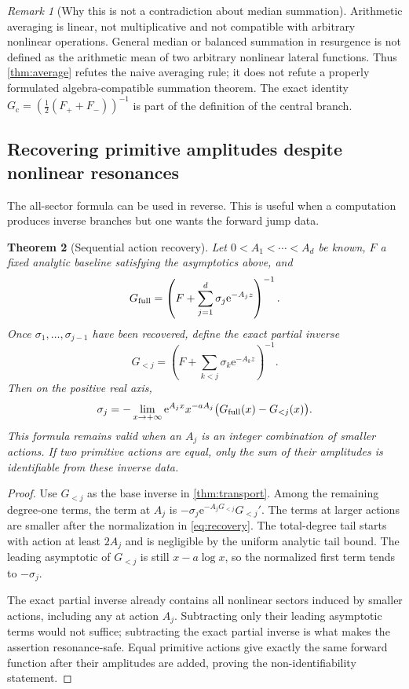 \documentclass[11pt,a4paper]{article}
\numberwithin{equation}{section}
\newtheorem{theorem}{Theorem}[section]
\theoremstyle{definition}
\theoremstyle{remark}
\newtheorem{remark}[theorem]{Remark}
\newcommand{\e}{\mathrm e}
\newcommand{\cG}{G_{\mathrm c}}
\begin{document}
\begin{remark}[Why this is not a contradiction about median summation]
Arithmetic averaging is linear, not multiplicative and not compatible with arbitrary nonlinear operations. General median or balanced summation in resurgence is not defined as the arithmetic mean of two arbitrary nonlinear lateral functions. Thus \cref{thm:average} refutes the naive averaging rule; it does not refute a properly formulated algebra-compatible summation theorem. The exact identity
$\cG=(\tfrac12(F_++F_-))^{-1}$ is part of the definition of the central branch.
\end{remark}

\subsection{Recovering primitive amplitudes despite nonlinear resonances}
The all-sector formula can be used in reverse. This is useful when a computation produces inverse branches but one wants the forward jump data.

\begin{theorem}[Sequential action recovery]
\label{thm:recovery}
Let $0<A_1<\cdots<A_d$ be known, $F$ a fixed analytic baseline satisfying the asymptotics above, and
\[
 G_{\rm full}=\left(F+\sum_{j=1}^d\sigma_j\e^{-A_jz}\right)^{-1}.
\]
Once $\sigma_1,\ldots,\sigma_{j-1}$ have been recovered, define the \emph{exact} partial inverse
\[
 G_{<j}=\left(F+\sum_{k<j}\sigma_k\e^{-A_kz}\right)^{-1}.
\]
Then on the positive real axis,
\begin{equation}
 \sigma_j=-\lim_{x\to+\infty}
 \e^{A_jx}x^{-aA_j}\big(G_{\rm full}(x)-G_{<j}(x)\big).
 \label{eq:recovery}
\end{equation}
This formula remains valid when an $A_j$ is an integer combination of smaller actions. If two primitive actions are equal, only the sum of their amplitudes is identifiable from these inverse data.
\end{theorem}
\begin{proof}
Use $G_{<j}$ as the base inverse in \cref{thm:transport}. Among the remaining degree-one terms, the term at $A_j$ is
$-\sigma_j\e^{-A_jG_{<j}}G_{<j}'$. The terms at larger actions are smaller after the normalization in \eqref{eq:recovery}. The total-degree tail starts with action at least $2A_j$ and is negligible by the uniform analytic tail bound. The leading asymptotic of $G_{<j}$ is still $x-a\log x$, so the normalized first term tends to $-\sigma_j$.

The exact partial inverse already contains all nonlinear sectors induced by smaller actions, including any at action $A_j$. Subtracting only their leading asymptotic terms would not suffice; subtracting the exact partial inverse is what makes the assertion resonance-safe. Equal primitive actions give exactly the same forward function after their amplitudes are added, proving the non-identifiability statement.
\end{proof}
\end{document}
